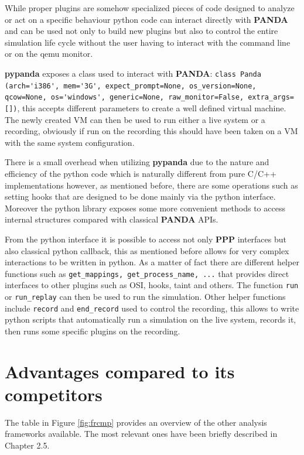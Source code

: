 While proper plugins are somehow specialized pieces of code designed to analyze or act on a specific behaviour python code can interact directly with \textbf{PANDA} and can be used not only to build new plugins but also to control the entire simulation life cycle without the user having to interact with the command line or on the qemu monitor.

\textbf{pypanda} exposes a class used to interact with \textbf{PANDA}: \lstinline{class Panda (arch='i386', mem='3G', expect_prompt=None, os_version=None, qcow=None, os='windows', generic=None, raw_monitor=False, extra_args=[])}, this accepts different parameters to create a well defined virtual machine. The newly created VM can then be used to run either a live system or a recording, obviously if run on the recording this should have been taken on a VM with the same system configuration. 

There is a small overhead when utilizing \textbf{pypanda} due to the nature and efficiency of the python code which is naturally different from pure C/C++ implementations however, as mentioned before, there are some operations such as setting hooks that are designed to be done mainly via the python interface. Moreover the python library exposes some more convenient methods to access internal structures compared with classical \textbf{PANDA} APIs. 

From the python interface it is possible to access not only \textbf{PPP} interfaces but also classical python callback, this as mentioned before allows for very complex interactions to be written in python. As a matter of fact there are different helper functions such as \lstinline{get_mappings, get_process_name, ...} that provides direct interfaces to other plugins such as OSI, hooks, taint and others. The function \lstinline{run} or \lstinline{run_replay} can then be used to run the simulation. Other helper functions include \lstinline{record} and \lstinline{end_record} used to control the recording, this allows to write python scripts that automatically run a simulation on the live system, records it, then runs some specific plugins on the recording. 

\section{Advantages compared to its competitors}

The table in Figure \ref{fig:frcmp} provides an overview of the other analysis frameworks available. The most relevant ones have been briefly described in Chapter 2.5. 

